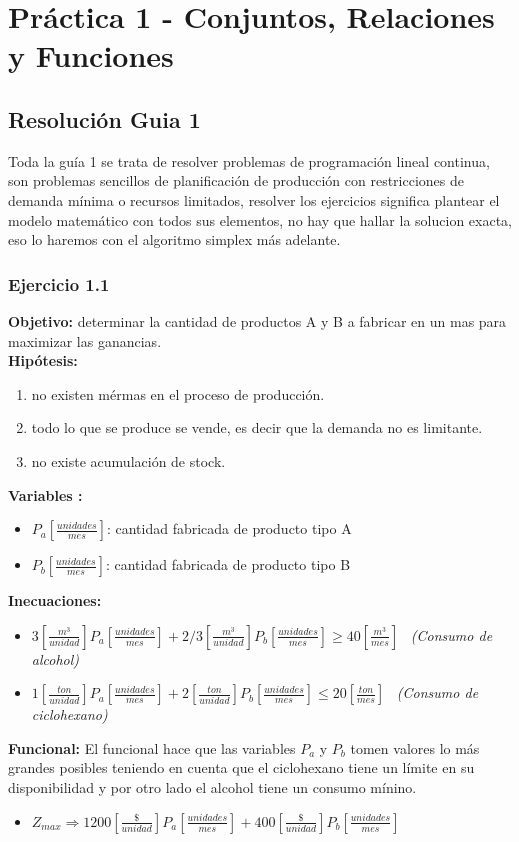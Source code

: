 \documentclass[12pt]{book}
\begin{document}
\chapter{Práctica 1 - Conjuntos, Relaciones y Funciones}


\section{Resoluci\'on Guia 1}
Toda la guía 1 se trata de resolver problemas de programación lineal continua, son problemas sencillos de planificación de producción con restricciones de demanda mínima o recursos limitados, resolver los ejercicios significa plantear el modelo matemático con todos sus elementos, no hay que hallar la solucion exacta, eso lo haremos con el algoritmo simplex más adelante.

\subsection{Ejercicio 1.1}
\textbf{Objetivo: }determinar la cantidad de productos A y B a fabricar en un mas para maximizar las ganancias.
\\
\textbf{Hip\'otesis: }
\begin{enumerate}
\item no existen m\'ermas en el proceso de producci\'on.
\item todo lo que se produce se vende, es decir que la demanda no es limitante.
\item no existe acumulaci\'on de stock.
\end{enumerate}

\textbf{Variables :}
\begin{itemize}
\item $P_a [\frac{unidades}{mes}]$: cantidad fabricada de producto tipo A
\item $P_b [\frac{unidades}{mes}]$: cantidad fabricada de producto tipo B 
\end{itemize}
\textbf{Inecuaciones: }
\begin{itemize}
\item $3 [\frac{m^3}{unidad}]  P_a[\frac{unidades}{mes}] + 2/3 [\frac{m^3}{unidad}]  P_b [\frac{unidades}{mes}] \geq 40 [\frac{m^3}{mes}]  $ \, \textit{(Consumo de alcohol)}

\item $1 [\frac{ton}{unidad}]  P_a[\frac{unidades}{mes}] + 2 [\frac{ton}{unidad}]  P_b [\frac{unidades}{mes}] \leq 20 [\frac{ton}{mes}]  $ \, \textit{ (Consumo de ciclohexano)}
\end{itemize}
\pagebreak
\textbf{Funcional: }El funcional hace que las variables $P_a$ y $P_b$ tomen valores lo m\'as grandes posibles teniendo en cuenta que el ciclohexano tiene un l\'imite en su disponibilidad y por otro lado el alcohol tiene un consumo m\'inino.
\begin{itemize}
\item $Z_{max} \Rightarrow 1200 [\frac{\$}{unidad}]  P_a[\frac{unidades}{mes}] + 400 [\frac{\$}{unidad}]  P_b [\frac{unidades}{mes}] $
\end{itemize}
\end{document}
